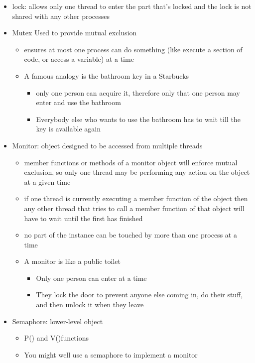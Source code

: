 \documentclass[11pt]{article}
\begin{document}
\begin{itemize}
  \item lock: allows only one thread to enter the part that's locked and the lock is not shared with any other processes
  \item Mutex Used to provide mutual exclusion 
  \begin{itemize}
    \item ensures at most one process can do something (like execute a section of code, or access a variable) at a time
    \item A famous analogy is the bathroom key in a Starbucks
    \begin{itemize}
      \item only one person can acquire it, therefore only that one person may enter and use the bathroom
      \item Everybody else who wants to use the bathroom has to wait till the key is available again
    \end{itemize}
  \end{itemize}
  \item Monitor: object designed to be accessed from multiple threads
  \begin{itemize}
    \item member functions or methods of a monitor object will enforce mutual exclusion, so only one thread may be performing any action on the object at a given time
    \item if one thread is currently executing a member function of the object then any other thread that tries to call a member function of that object will have to wait until the first has finished
    \item no part of the instance can be touched by more than one process at a time
    \item A monitor is like a public toilet
    \begin{itemize}
      \item Only one person can enter at a time
      \item They lock the door to prevent anyone else coming in, do their stuff, and then unlock it when they leave
    \end{itemize}
  \end{itemize}
  \item Semaphore: lower-level object
  \begin{itemize}
    \item P() and V()functions
    \item You might well use a semaphore to implement a monitor

\end{itemize}
\end{itemize}
\end{document}
